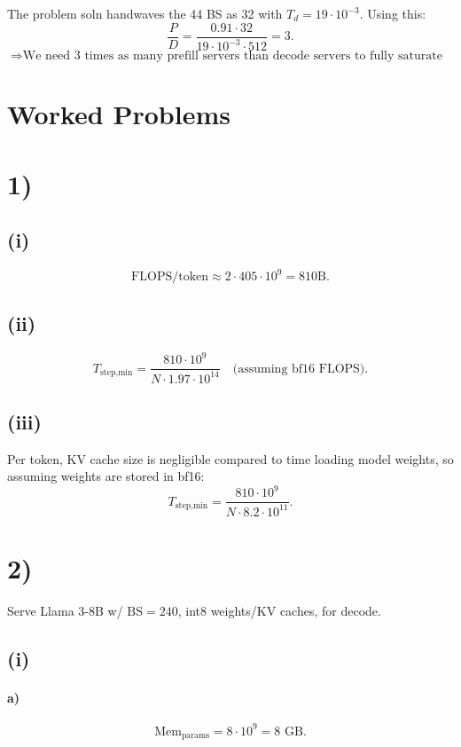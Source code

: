 \documentclass[11pt]{article}
\newcommand{\Tstepmin}{T_{\text{step,min}}}
\begin{document}
The problem soln handwaves the 44 BS as 32 with $T_d = 19 \cdot 10^{-3}$. Using this:
\[
\frac{P}{D} = \frac{0.91 \cdot 32}{19 \cdot 10^{-3} \cdot 512} = 3.
\]
\[
\Rightarrow \text{We need 3 times as many prefill servers than decode servers to fully saturate both.}
\]

\section*{Worked Problems}

\section*{1)}

\subsection*{(i)}

\[
\text{FLOPS/token} \approx 2 \cdot 405 \cdot 10^9 = 810\text{B.}
\]

\subsection*{(ii)}

\[
\Tstepmin = \frac{810 \cdot 10^9}{N \cdot 1.97 \cdot 10^{14}} \quad \text{(assuming bf16 FLOPS).}
\]

\subsection*{(iii)}

Per token, KV cache size is negligible compared to time loading model weights, so assuming weights are stored in bf16:
\[
\Tstepmin = \frac{810 \cdot 10^9}{N \cdot 8.2 \cdot 10^{11}}.
\]

\section*{2)}

Serve Llama 3-8B w/ $\text{BS} = 240$, int8 weights/KV caches, for decode.

\subsection*{(i)}

\paragraph{a)}
\[
\text{Mem}_{\text{params}} = 8 \cdot 10^9 = 8 \text{ GB.}
\]
\end{document}
